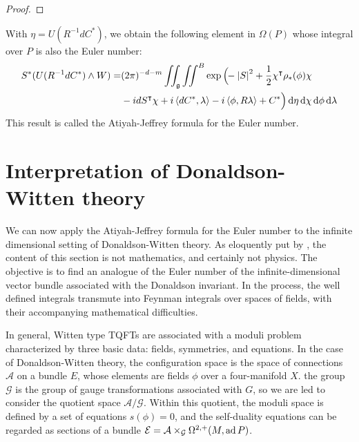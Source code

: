 \begin{proof}
\begin{comment}
	If  $\eta$ contains any factor of  $\omega_a$,
	i.e. any vertical component in  $T^*(P\times V)$, then $\eta\wedge W = 0$
	and the statement holds trivially.

	The horizontal space at any point is  $H_pP\oplus V$.
	Now suppose $\eta$ is horizontal, i.e. $\eta = dx_I\wedge de_I$, where 
	$dx_i$ spans the horizontal
	space  $H_pP$ and  $dy_i$ spans the tangent space of  $V$. 
	Then from Prop \ref{prop:integral_horizontal_proj}, $\pi_*(\eta\wedge W) \in
	\Omega(P\times_\rho V)$ is the same form calculated by taking any horizontal
	lifts of tangent vectors. Then $\sigma^*\pi_*(\eta\wedge
	W)(v_1,\ldots,v_k)=\eta(w_1,\ldots,w_k)$, $w_i$
	is a horizontal lift of $D\sigma(v_1)$. 

	On the other hand, $S^*(\eta\wedge W) = dx_I\wedge d(e_I\circ S) \wedge W$.
	Then  $s^*S^*(\eta\wedge W) = $
	\end{comment}
\end{proof}


With $\eta=U(R^{-1}dC^*)$, we obtain the following element in $\Omega(P)$ whose
integral over $P$ is also the Euler number:
\begin{align} \label{eq:AJ_formula_euler}
S^*(U(R^{-1}dC^*)\wedge W)	
= &(2\pi)^{-d-m}\iint_{\g}\iint^B 
\exp\Big(\!\!-\abs{S}^2+\frac{1}{2}\chi^{\intercal}\rho_*(\phi)\chi \\
	&- idS^\intercal \chi
	+i\gen{dC^*,\lambda}-i\gen{\phi,R\lambda} + C^*\Big)  \odif{\eta}
	\odif{\chi} \odif{\phi}\odif{\lambda}  \nonumber 
\end{align}
This result is called the Atiyah-Jeffrey formula for the Euler number.

\section{Interpretation of Donaldson-Witten theory}
We can now apply the Atiyah-Jeffrey formula for the Euler number to the infinite 
dimensional setting of Donaldson-Witten theory. As eloquently put by \citet{naber},
the content of this section is not mathematics, and certainly not physics. The
objective is to find an analogue of the Euler number of the
infinite-dimensional vector bundle associated with the Donaldson invariant. In
the process, the well defined integrals transmute into Feynman integrals
over spaces of fields, with their accompanying mathematical difficulties.  

In general, Witten type TQFTs are associated with a moduli problem characterized
by three basic data: fields, symmetries, and equations.
In the case of Donaldson-Witten theory, the configuration space is the space of
connections $\mathcal{A}$ on a bundle $E$, whose elements are fields 
$\phi$ over a four-manifold  $X$.  the group $\mathcal{G}$ is the group of gauge
transformations associated with $G$, so we are led to consider the quotient
space  $\mathcal{A}/\mathcal{G}$. Within this quotient, the moduli space is
defined by a set of equations $s(\phi)=0$, and the self-duality equations can be
regarded as sections of a bundle
$\mathcal{E}=\mathcal{A}\times_{\mathcal{G}}\Omega^{2,+}(M,\operatorname{ad} P)$. 
 

